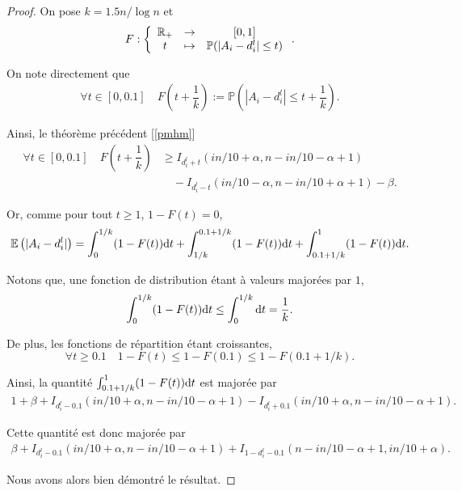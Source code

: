 \begin{proof}
    On pose \( k = 1.5n/\log n\) et  
    \[
        F : \left\{
            \begin{array}[]{ccc}
                \R_+ & \to & [0,1]\\
                t & \mapsto & \mathbb P(|A_i - d_i^l| \leq t)
            \end{array}
        \right.   .
    \]

    On note directement que 
    \begin{align*}
        \forall t \in [0, 0.1] \quad F\left( t + \dfrac{1}{k} \right) := \mathbb P\left(|A_i - d_i^l| \leq t + \dfrac{1}{k}\right).
    \end{align*}

    Ainsi, le théorème précédent [\ref{pmhm}]
    \begin{align*}
        \forall t \in [0, 0.1] \quad F\left( t + \dfrac{1}{k} \right) & \geq  I_{d_i^l + t}(in/10 + \alpha, n - in/10 -  \alpha + 1)\\
        & \quad - I_{d_i^l - t}(in/10 - \alpha, n - in/10 +  \alpha + 1) - \beta .
    \end{align*}

    Or, comme pour tout \(t \geq 1\), \(1 - F(t) = 0\),
    \[
        \mathbb E\left( |A_i - d_i^l| \right) = \int_{0}^{1/k} (1 - F(t))\mathrm{d} t + \int_{1/k}^{0.1 + 1/k} (1 - F(t))\mathrm{d} t + \int_{0.1 + 1/k}^{1} (1 - F(t))\mathrm{d} t .
    \]

    Notons que, une fonction de distribution étant à valeurs majorées par \(1\), 
    \[
        \int_0^{1/k} (1 - F(t))\mathrm{d} t \leq \int_0^{1/k}\mathrm{d} t = \dfrac{1}{k}.
    \]

    De plus, les fonctions de répartition étant croissantes,
    \[
        \forall t \geq 0.1 \quad 1 - F(t) \leq 1 - F(0.1) \leq 1 - F(0.1 + 1/k).
    \]

    Ainsi, la quantité \( \int_{0.1 + 1/k}^{1} (1 - F(t))\mathrm{d} t\) est majorée par 
    \begin{align*}
        1 + \beta + I_{d_i^l - 0.1}(in/10 + \alpha, n - in/10 -  \alpha + 1) -  I_{d_i^l + 0.1}(in/10 + \alpha, n - in/10 -  \alpha + 1).
    \end{align*}

    Cette quantité est donc majorée par 
    \begin{align*}
        \beta + I_{d_i^l - 0.1}(in/10 + \alpha, n - in/10 -  \alpha + 1) + I_{1 - d_i^l - 0.1}(n - in/10 -  \alpha + 1, in/10 + \alpha).
    \end{align*}


    Nous avons alors bien démontré le résultat.
\end{proof}

